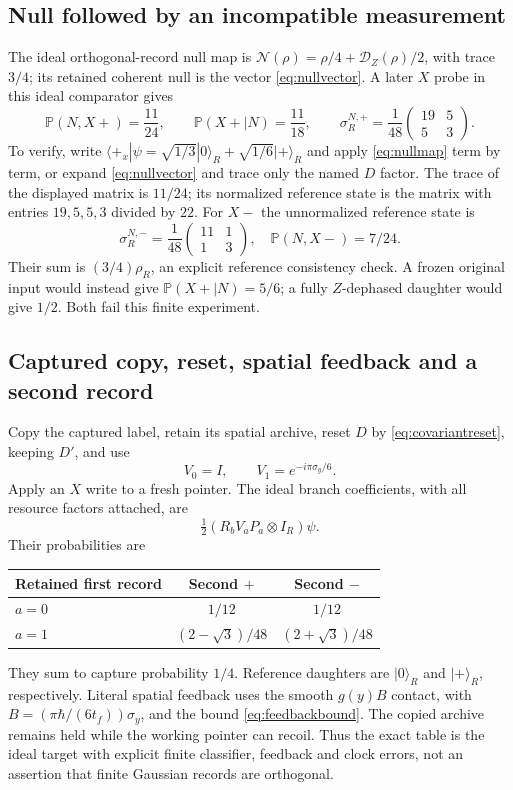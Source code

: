 \documentclass[11pt]{article}
\theoremstyle{definition}\newtheorem{assumption}[theorem]{Constitutive assumption}
\theoremstyle{remark}\newtheorem{remark}[theorem]{Remark}
\newcommand{\ket}[1]{|#1\rangle}\newcommand{\bra}[1]{\langle#1|}
\newcommand{\Prb}{\mathbb P}\newcommand{\TV}{d_{\rm TV}}
\begin{document}
\subsection{Null followed by an incompatible measurement}
The ideal orthogonal-record null map is $\mathcal N(\rho)=\rho/4+\mathcal D_Z(\rho)/2$, with trace $3/4$; its retained coherent null is the vector \eqref{eq:nullvector}. A later $X$ probe in this ideal comparator gives
\begin{equation}\label{eq:nullnumbers}
 \Prb(N,X+)=\frac{11}{24},\qquad
 \Prb(X+\mid N)=\frac{11}{18},\qquad
 \sigma_R^{N,+}=\frac1{48}
               \begin{pmatrix}19&5\\5&3\end{pmatrix}.
\end{equation}
To verify, write $\bra{+_x}\psi=\sqrt{1/3}\ket0_R+\sqrt{1/6}\ket+_R$ and apply \eqref{eq:nullmap} term by term, or expand \eqref{eq:nullvector} and trace only the named $D$ factor. The trace of the displayed matrix is $11/24$; its normalized reference state is the matrix with entries $19,5,5,3$ divided by $22$. For $X-$ the unnormalized reference state is
\[
 \sigma_R^{N,-}=\frac1{48}\begin{pmatrix}11&1\\1&3\end{pmatrix},
 \quad\Prb(N,X-)=7/24.
\]
Their sum is $(3/4)\rho_R$, an explicit reference consistency check. A frozen original input would instead give $\Prb(X+\mid N)=5/6$; a fully $Z$-dephased daughter would give $1/2$. Both fail this finite experiment.

\subsection{Captured copy, reset, spatial feedback and a second record}
Copy the captured label, retain its spatial archive, reset $D$ by \eqref{eq:covariantreset}, keeping $D'$, and use
\[
 V_0=I,\qquad V_1=e^{-i\pi\sigma_y/6}.
\]
Apply an $X$ write to a fresh pointer. The ideal branch coefficients, with all resource factors attached, are
\[
 \tfrac12(R_bV_aP_a\otimes I_R)\psi.
\]
Their probabilities are
\begin{center}
\begin{tabular}{@{}lcc@{}}\toprule
Retained first record & Second $+$ & Second $-$\\\midrule
$a=0$ & $1/12$ & $1/12$\\
$a=1$ & $(2-\sqrt3)/48$ & $(2+\sqrt3)/48$\\\bottomrule
\end{tabular}
\end{center}
They sum to capture probability $1/4$. Reference daughters are $\ket0_R$ and $\ket+_R$, respectively. Literal spatial feedback uses the smooth $g(y)B$ contact, with $B=(\pi\hbar/(6t_f))\sigma_y$, and the bound \eqref{eq:feedbackbound}. The copied archive remains held while the working pointer can recoil. Thus the exact table is the ideal target with explicit finite classifier, feedback and clock errors, not an assertion that finite Gaussian records are orthogonal.
\end{document}
